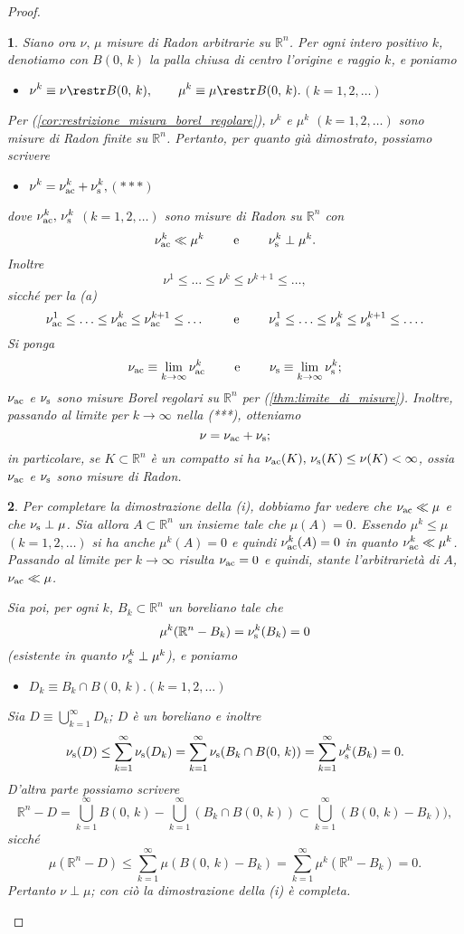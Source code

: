 \documentclass[a4paper,10pt,openright,oneside]{book}
\theoremstyle{theoremstyle}
\theoremstyle{theoremstylewoheader}
\theoremstyle{theoremstyle}
\theoremstyle{proofsecstyle}
\newtheorem{proofsec}{}
\theoremstyle{nonumberplain}
\newtheorem{proof}{Dim.}
\newcommand{\RR}{\ensuremath{\mathbb{R}}}
\newcommand{\mymath}[2]{\begin{itemize}%
  \item[]\hfill\hbox{}\ensuremath{\displaystyle #1}\hfill\ensuremath{\displaystyle #2}%
  \end{itemize}}
\begin{document}
\begin{proof}
\begin{proofsec}
Siano ora $\nu,\, \mu$ misure di Radon arbitrarie su $\RR^n$. Per ogni intero positivo $k$, denotiamo con $B(0,\, k)$ la palla chiusa di centro l'origine e raggio $k$, e poniamo \mymath{\nu^k \equiv \nu \restr B(0,\, k),\qquad \mu^k \equiv \mu \restr B(0,\, k).}{(k = 1, 2, \ldots)} Per (\ref{cor:restrizione_misura_borel_regolare}), $\nu^k$ e $\mu^k$ $(k = 1, 2, \ldots)$ sono misure di Radon \emph{finite} su $\RR^n$. Pertanto, per quanto già dimostrato, possiamo scrivere \mymath{\nu^k = \nu^k_\textup{ac} + \nu^k_\textup{s},}{(***)} dove $\nu^k_\textup{ac},\, \nu^k_\textup{s}$ $(k = 1, 2, \ldots)$ sono misure di Radon su $\RR^n$ con
\[
\nu^k_\textup{ac} \ll \mu^k \qquad\text{ e }\qquad \nu^k_\textup{s} \perp \mu^k.
\]
Inoltre
\[
\nu^1 \le \ldots \le \nu^k \le \nu^{k+1} \le \ldots,
\]
sicché per la (a)
\[
\nu^1_\textup{ac} \le \ldots \le \nu^k_\textup{ac} \le \nu^{k+1}_\textup{ac} \le \ldots \qquad\text{ e }\qquad \nu^1_\textup{s} \le \ldots \le \nu^k_\textup{s} \le \nu^{k+1}_\textup{s} \le \ldots.
\]
Si ponga
\[
\nu_\textup{ac} \equiv \lim_{k \to \infty} \nu^k_\textup{ac} \qquad\text{ e }\qquad \nu_\textup{s} \equiv \lim_{k \to \infty} \nu^k_\textup{s};
\]
$\nu_\textup{ac}$ e $\nu_\textup{s}$ sono misure Borel regolari su $\RR^n$ per (\ref{thm:limite_di_misure}). Inoltre, passando al limite per $k \to \infty$ nella (***), otteniamo
\[
\nu = \nu_\textup{ac} + \nu_\textup{s};
\]
in particolare, se $K \subset \RR^n$ è un compatto si ha $\nu_\textup{ac}(K),\, \nu_\textup{s}(K) \le \nu(K) < \infty$, ossia $\nu_\textup{ac}$ e $\nu_\textup{s}$ sono misure di Radon.
\end{proofsec}

\begin{proofsec}
Per completare la dimostrazione della (i), dobbiamo far vedere che $\nu_\textup{ac} \ll \mu$ e che $\nu_\textup{s} \perp \mu$. Sia allora $A \subset \RR^n$ un insieme tale che $\mu(A) = 0$. Essendo $\mu^k \le \mu$ $(k = 1, 2, \ldots)$ si ha anche $\mu^k(A) = 0$ e quindi $\nu^k_\textup{ac}(A) = 0$ in quanto $\nu^k_\textup{ac} \ll \mu^k$. Passando al limite per $k \to \infty$ risulta $\nu_\textup{ac} = 0$ e quindi, stante l'arbitrarietà di $A$, $\nu_\textup{ac} \ll \mu$.

Sia poi, per ogni $k$, $B_k \subset \RR^n$ un boreliano tale che
\[
\mu^k(\RR^n - B_k) = \nu^k_\textup{s}(B_k) = 0
\]
(esistente in quanto $\nu^k_\textup{s} \perp \mu^k$), e poniamo \mymath{D_k \equiv B_k \cap B(0,\, k).}{(k = 1, 2, \ldots)} Sia $D \equiv \bigcup_{k=1}^\infty D_k$; $D$ è un boreliano e inoltre
\[
\nu_\textup{s}(D) \le \sum_{k=1}^\infty \nu_\textup{s}(D_k) = \sum_{k=1}^\infty \nu_\textup{s}(B_k \cap B(0,\, k)) = \sum_{k=1}^\infty \nu^k_\textup{s}(B_k) = 0.
\]
D'altra parte possiamo scrivere
\[
\RR^n - D = \bigcup_{k=1}^\infty B(0,\, k) - \bigcup_{k=1}^\infty (B_k \cap B(0,\, k)) \subset \bigcup_{k=1}^\infty (B(0,\, k) - B_k)),
\]
sicché
\[
\mu(\RR^n - D) \le \sum_{k=1}^\infty \mu(B(0,\, k) - B_k) = \sum_{k=1}^\infty \mu^k(\RR^n - B_k) = 0.
\]
Pertanto $\nu \perp \mu$; con ciò la dimostrazione della (i) è completa.
\end{proofsec}


\end{proof}
\end{document}
